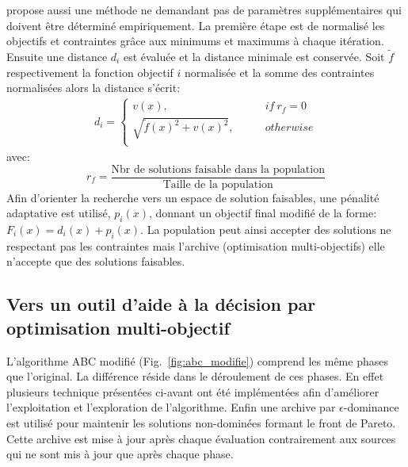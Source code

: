 \cite{Woldesenbet20073077} propose aussi une méthode ne demandant pas de paramètres supplémentaires
qui doivent être déterminé empiriquement. La première étape est de normalisé les objectifs et contraintes
grâce aux minimums et maximums à chaque itération. Ensuite une distance $d_{i}$ est
évaluée et la distance minimale est conservée. Soit $\tilde{f}$ respectivement la fonction objectif $i$ normalisée
et la somme des contraintes normalisées alors la distance s’écrit:
\begin{align}\label{eq:distance_measure}
    d_{i} = \begin{cases}
                v(x),                               \qquad & if\  r_{f} = 0\\
                \sqrt{\tilde{f}(x)^{2} + v(x)^{2}}, \qquad & otherwise\\
            \end{cases}
\end{align}
avec:
\begin{equation*}
    r_{f} = \frac{\text{Nbr de solutions faisable dans la population}}{\text{Taille de la population}}
\end{equation*}
Afin d’orienter la recherche vers un espace de solution faisables, une pénalité adaptative
est utilisé, $p_{i}(x)$, donnant un objectif final modifié de la forme: $F_{i}(x) = d_{i}(x) + p_{i}(x)$.
La population peut ainsi accepter des solutions ne respectant pas les contraintes mais
l’archive (optimisation multi-objectifs) elle n’accepte que des solutions faisables.


\subsection{Vers un outil d’aide à la décision par optimisation multi-objectif} %
\label{sub:vers_un_outil_d_aide_à_la_décision_par_optimisation_multi_objectif}

L’algorithme ABC modifié (Fig.~\ref{fig:abc_modifie}) comprend les même phases que l’original. La différence réside
dans le déroulement de ces phases. En effet plusieurs technique présentées ci-avant
ont été implémentées afin d’améliorer l’exploitation et l’exploration de l’algorithme.
Enfin une archive par $\epsilon$-dominance est utilisé pour maintenir les solutions
non-dominées formant le front de Pareto. Cette archive est mise à jour après chaque
évaluation contrairement aux sources qui ne sont mis à jour que après chaque phase.

